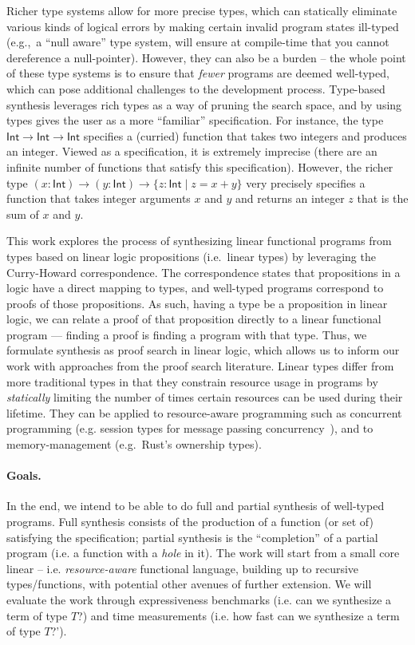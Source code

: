 \documentclass{llncs}
\newcommand{\mypara}[1]{\paragraph{\textbf{#1}.}}
\begin{document}
Richer type systems allow for more precise types, which can
statically eliminate various kinds of logical errors by making certain
invalid program states ill-typed (e.g.,~a ``null aware'' type system,
will ensure at compile-time that you cannot dereference a
null-pointer). However, they can also be a burden -- the whole point
of these type systems is to ensure that \emph{fewer} programs are
deemed well-typed, which can pose additional challenges to the
development process. Type-based synthesis leverages rich types as a
way of pruning the search space, and by using types gives the user as
a more ``familiar'' specification. For instance, the type
$\mathsf{Int} \rightarrow \mathsf{Int} \rightarrow \mathsf{Int}$
specifies a (curried) function that takes two integers and produces an
integer. Viewed as a specification, it is extremely imprecise (there
are an infinite number of functions that satisfy this specification).
However, the richer type $(x{:}\mathsf{Int}) \rightarrow
(y{:}\mathsf{Int}) \rightarrow \{z{:}\mathsf{Int} \mid z = x+y\}$
very precisely specifies a function that takes integer arguments $x$
and $y$ and returns an integer $z$ that is the sum of $x$ and $y$. 

%
This work explores the process of synthesizing linear functional
programs from types based on linear logic propositions (i.e.~linear
types) by leveraging the Curry-Howard correspondence.  The
correspondence states that propositions in a logic have a direct
mapping to types, and well-typed programs correspond to proofs of
those propositions.  As such, having a type be a proposition in linear
logic, we can relate a proof of that proposition directly to a linear
functional program — finding a proof is finding a program with that
type. Thus, we formulate synthesis as proof search in linear logic,
which allows us to inform our work with approaches from the proof
search literature.  Linear types differ from more traditional types in
that they constrain resource usage in programs by \emph{statically}
limiting the number of times certain resources can be used during
their lifetime.  They can be applied to resource-aware programming
such as concurrent programming (e.g. session types for message passing
concurrency~\cite{}), and to memory-management (e.g.~Rust's ownership
types).

\mypara{Goals}
In the end, we intend to be able to do full and partial synthesis of
well-typed programs. Full synthesis consists of the production of a
function (or set of) satisfying the specification; partial synthesis
is the ``completion'' of a partial program (i.e. a function with a
\emph{hole} in it). The work will start from a small core linear --
i.e. \emph{resource-aware} functional language, building up to
recursive types/functions, with potential other avenues of further
extension. 
%
We will evaluate the work through
expressiveness benchmarks (i.e. can we synthesize a term of type $T$?) and time
measurements (i.e. how fast can we synthesize a term of type $T$?').
\end{document}
